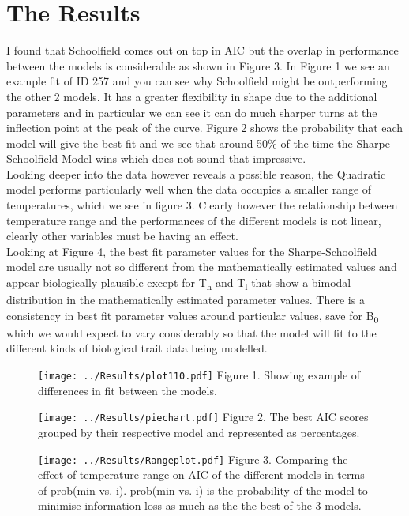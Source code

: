 \documentclass[12pt]{article}
\begin{document}
  \section{The Results}
  I found that Schoolfield comes out on top in AIC but the overlap in performance between the models is considerable as shown in Figure 3. 
  In Figure 1 we see an example fit of ID 257 and you can see why Schoolfield 
  might be outperforming the other 2 models. It has a greater flexibility in shape due to the 
  additional parameters and in particular we can see it can do much sharper turns at the inflection point at 
  the peak of the curve. Figure 2 shows the probability that each model will give the best fit and we see that around 50\% of the time
  the Sharpe-Schoolfield Model wins which does not sound that impressive. \\
  Looking deeper into the data however reveals a possible reason, the Quadratic model performs particularly well when the data 
  occupies a smaller range of temperatures, which we see in figure 3. Clearly however the relationship between temperature range and
  the performances of the different models is not linear, clearly other variables must be having an effect. \\
  Looking at Figure 4, the best fit parameter values for 
  the Sharpe-Schoolfield model are usually not so different from the 
  mathematically estimated values and appear biologically plausible except for T\textsubscript{h} and T\textsubscript{l} 
  that show a bimodal distribution in the mathematically estimated parameter values. There is a consistency in best fit parameter values 
  around particular values, save for B\textsubscript{0} which we would expect to vary considerably so that the model will fit to 
  the different kinds of biological trait data being modelled.
  
  \begin{figure}[]
    \texttt{[image: ../Results/plot110.pdf]}
    Figure 1. Showing example of differences in fit between the models.
  \end{figure}

  \begin{figure}[]
    \texttt{[image: ../Results/piechart.pdf]}
    Figure 2. The best AIC scores grouped by their respective model and represented as percentages. 
  \end{figure}

  \begin{figure}[]
    \texttt{[image: ../Results/Rangeplot.pdf]}
    Figure 3. Comparing the effect of temperature range on AIC of the different models in terms of prob(min vs. i). 
    prob(min vs. i) is the probability of the model to minimise information loss as much as the the best of the 3 models.
  \end{figure}
\end{document}
